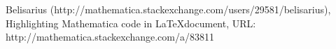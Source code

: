 \documentclass[10pt]{article}
\begin{document}
\newpage
\begin{thebibliography}{9}


Belisarius (http://mathematica.stackexchange.com/users/29581/belisarius), Highlighting Mathematica code in \LaTeX document, URL: http://mathematica.stackexchange.com/a/83811

\end{thebibliography}
\end{document}
